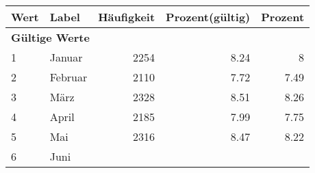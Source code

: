      \begin{longtable}{lXrrr}
     \toprule
     \textbf{Wert} & \textbf{Label} & \textbf{Häufigkeit} & \textbf{Prozent(gültig)} & \textbf{Prozent} \\
     \endhead
     \midrule
     \multicolumn{5}{l}{\textbf{Gültige Werte}}\\

     1 &
     \multicolumn{1}{X}{ Januar   } &


       \num{2254} &
       \num[round-mode=places,round-precision=2]{8,24} &
         \num[round-mode=places,round-precision=2]{8} \\

     2 &
     \multicolumn{1}{X}{ Februar   } &


       \num{2110} &
       \num[round-mode=places,round-precision=2]{7,72} &
         \num[round-mode=places,round-precision=2]{7,49} \\

     3 &
     \multicolumn{1}{X}{ März   } &


       \num{2328} &
       \num[round-mode=places,round-precision=2]{8,51} &
         \num[round-mode=places,round-precision=2]{8,26} \\

     4 &
     \multicolumn{1}{X}{ April   } &


       \num{2185} &
       \num[round-mode=places,round-precision=2]{7,99} &
         \num[round-mode=places,round-precision=2]{7,75} \\

     5 &
     \multicolumn{1}{X}{ Mai   } &


       \num{2316} &
       \num[round-mode=places,round-precision=2]{8,47} &
         \num[round-mode=places,round-precision=2]{8,22} \\

     6 &
     \multicolumn{1}{X}{ Juni   } &



\end{longtable}
